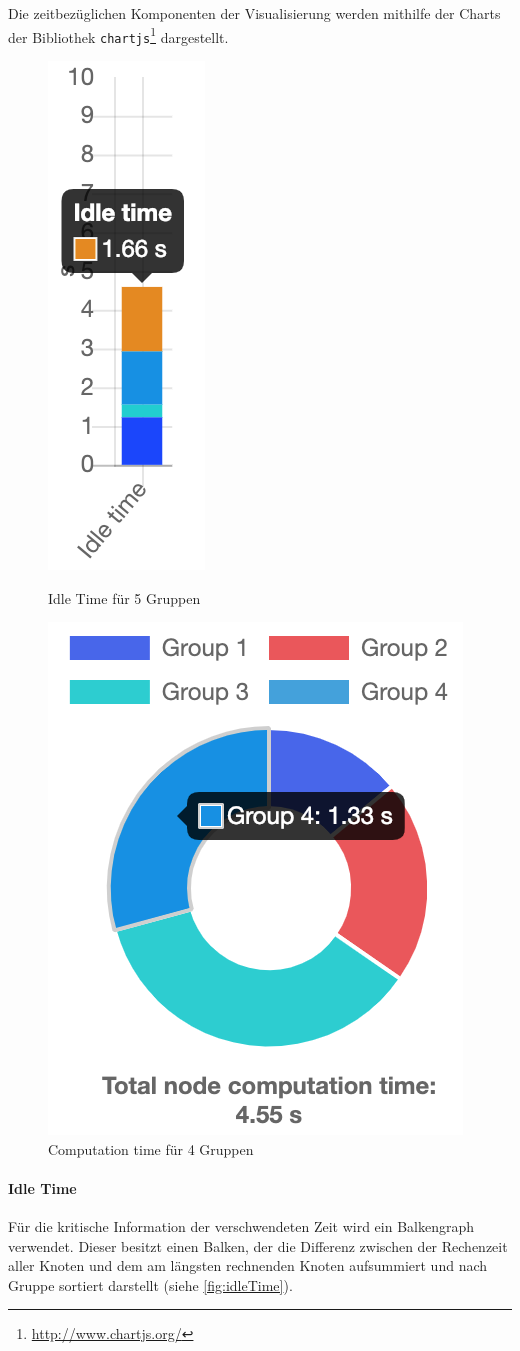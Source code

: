 Die zeitbezüglichen Komponenten der Visualisierung werden mithilfe der Charts
der Bibliothek \verb|chartjs|\footnote{\url{http://www.chartjs.org/}} dargestellt.
\begin{figure}
	\centering
	\begin{minipage}{.5\textwidth}
		\centering
		\includegraphics[height=.5\linewidth]{img/Implementierung/IdleTime}
		\caption{Idle Time für 5 Gruppen}
		\label{fig:idleTime}
	\end{minipage}%
	\begin{minipage}{.5\textwidth}
		\centering
		\includegraphics[height=.5\linewidth]{img/Implementierung/ComputationTime}
		\caption{Computation time für 4 Gruppen}
		\label{fig:computationTime}
	\end{minipage}
\end{figure}

\paragraph{Idle Time}

Für die kritische Information der verschwendeten Zeit wird ein Balkengraph verwendet.
Dieser besitzt einen Balken, der die Differenz zwischen der Rechenzeit aller Knoten und dem am längsten rechnenden Knoten
aufsummiert und nach Gruppe sortiert darstellt (siehe \autoref{fig:idleTime}).

